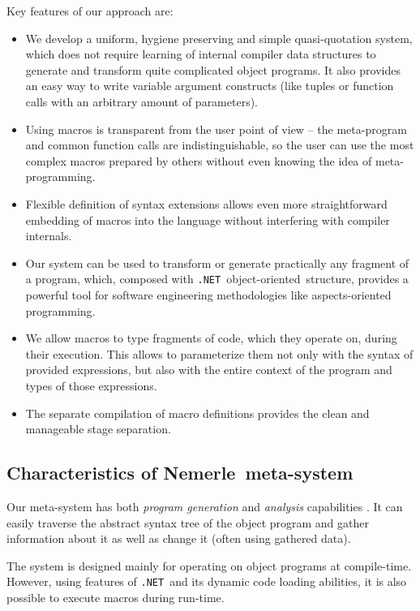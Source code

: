 \documentclass{llncs}
\newcommand{\net}[0]{{\tt .NET}}
\newcommand{\nem}[0]{Nemerle}
\newcommand{\oo}[0]{object-oriented}
\begin{document}
Key features of our approach are:
\begin{itemize}
  \item We develop a uniform, hygiene preserving and simple quasi-quotation system, 
    which does not require learning of internal compiler data structures to generate 
    and transform quite complicated object programs. It also provides an easy way to 
    write variable argument constructs (like tuples or function calls with an arbitrary 
    amount of parameters).
  \item Using macros is transparent from the user point of view -- the meta-program and 
    common function calls are indistinguishable, so the user can use the most complex
    macros prepared by others without even knowing the idea of meta-programming.
  \item Flexible definition of syntax extensions allows even more straightforward 
    embedding of macros into the language without interfering with compiler internals.
  \item Our system can be used to transform or generate practically any fragment
    of a program, which, composed with \net\ \oo\ structure, provides a powerful tool for
    software engineering methodologies like aspects-oriented programming.
  \item We allow macros to type fragments of code, which they operate on, during
    their execution. This allows to parameterize them not only with the syntax of provided
    expressions, but also with the entire context of the program and types of those 
    expressions.
  \item The separate compilation of macro definitions provides the clean and manageable 
    stage separation.
\end{itemize}

\subsection{Characteristics of \nem\ meta-system}
Our meta-system has both \emph{program generation} and \emph{analysis}
capabilities \cite{Meta:Accomplishments}. It can easily traverse the abstract 
syntax tree of the object program and gather information about it as well 
as change it (often using gathered data).

The system is designed mainly for operating on object programs at compile-time.
However, using features of \net\ and its dynamic code loading abilities, it is
also possible to execute macros during run-time. 
\end{document}
